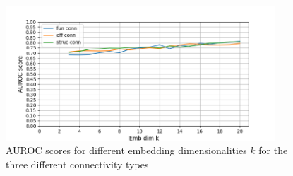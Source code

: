 \documentclass[]{article}
\begin{document}
\begin{figure}
	\centering
	\includegraphics[width=0.9\textwidth]{plotted_figures/dimensionality_trend.png}
	
	\caption{AUROC scores for different embedding dimensionalities $k$ for the three different connectivity types}
	\label{fig:disc_dim_trend}
\end{figure}
\end{document}
